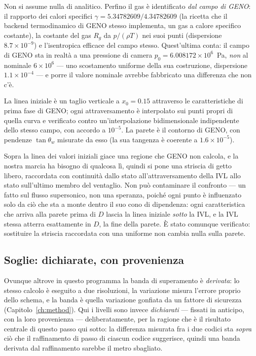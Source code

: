 Non si assume nulla di analitico. Perfino il gas è identificato
\emph{dal campo di GENO}: il rapporto dei calori specifici
$\gamma = 5.34782609/4.34782609$ (la ricetta che il backend
termodinamico di GENO stesso implementa, un gas a calore specifico
costante), la costante del gas $R_g$ da $p/(\rho T)$ nei suoi punti
(dispersione $8.7\times10^{-9}$) e l'isentropica efficace del campo
stesso. Quest'ultima conta: il campo di GENO sta in realtà a una
pressione di camera $p_0 = 6.008172\times10^{6}$~Pa, \emph{non} al
nominale $6\times10^{6}$ --- uno scostamento uniforme della sua
costruzione, dispersione $1.1\times10^{-4}$ --- e porre il valore
nominale avrebbe fabbricato una differenza che non c'è.

La linea iniziale è un taglio verticale a $x_0 = 0.15$ attraverso le
caratteristiche di prima fase di GENO; ogni attraversamento è
interpolato sui punti propri di quella curva e verificato contro
un'interpolazione bidimensionale indipendente dello stesso campo, con
accordo a $10^{-5}$. La parete è il contorno di GENO, con pendenze
$\tan\theta_w$ misurate da esso (la sua tangenza è coerente a
$1.6\times10^{-5}$).

Sopra la linea dei valori iniziali giace una regione che GENO non
calcola, e la nostra marcia ha bisogno di qualcosa lì, quindi si pone
una striscia di getto libero, raccordata con continuità dallo stato
all'attraversamento della IVL allo stato sull'ultimo membro del
ventaglio. Non può contaminare il confronto --- un fatto sul flusso
supersonico, non una speranza, poiché ogni punto è influenzato solo
da ciò che sta a monte dentro il suo cono di dipendenza: ogni
caratteristica che arriva alla parete prima di $D$ lascia la linea
iniziale \emph{sotto} la IVL, e la IVL stessa atterra esattamente in
$D$, la fine della parete. È stato comunque verificato: sostituire
la striscia raccordata con una uniforme non cambia nulla sulla
parete.

\subsection{Soglie: dichiarate, con provenienza}

Ovunque altrove in questo programma la banda di superamento è
\emph{derivata}: lo stesso calcolo è eseguito a due risoluzioni, la
variazione misura l'errore proprio dello schema, e la banda è quella
variazione gonfiata da un fattore di sicurezza
(Capitolo~\ref{ch:method}). Qui i livelli sono invece
\emph{dichiarati} --- fissati in anticipo, con la loro provenienza
--- deliberatamente, per la ragione che è il risultato centrale di
questo passo qui sotto: la differenza misurata fra i due codici sta
\emph{sopra} ciò che il raffinamento di passo di ciascun codice
suggerisce, quindi una banda derivata dal raffinamento sarebbe il
metro sbagliato.

